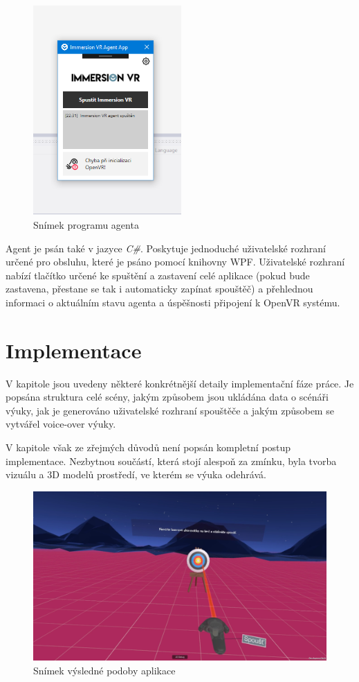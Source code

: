 \begin{figure}[h!]
\centering
\includegraphics[height=8cm]{src/assets/agent-screen.png}
\caption{Snímek programu agenta}
\end{figure}

Agent je psán také v jazyce \emph{C\#}. Poskytuje jednoduché uživatelské
rozhraní určené pro obsluhu, které je psáno pomocí knihovny WPF.
Uživatelské rozhraní nabízí tlačítko určené ke spuštění a zastavení celé
aplikace (pokud bude zastavena, přestane se tak i automaticky zapínat
spouštěč) a přehlednou informaci o aktuálním stavu agenta a úspěšnosti
připojení k OpenVR systému.

\section{Implementace}\label{implementace}

V kapitole jsou uvedeny některé konkrétnější detaily implementační fáze
práce. Je popsána struktura celé scény, jakým způsobem jsou ukládána
data o scénáři výuky, jak je generováno uživatelské rozhraní spouštěče a
jakým způsobem se vytvářel voice-over výuky.

V kapitole však ze zřejmých důvodů není popsán kompletní postup
implementace. Nezbytnou součástí, která stojí alespoň za zmínku, byla
tvorba vizuálu a 3D modelů prostředí, ve kterém se výuka odehrává.

\begin{figure}[h!]
\centering
\includegraphics[width=12cm]{src/assets/result.png}
\caption{Snímek výsledné podoby aplikace}
\end{figure}

